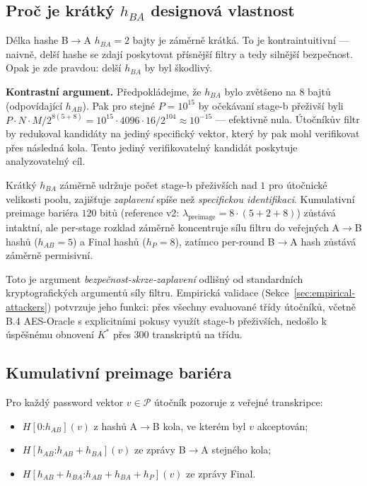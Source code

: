 \documentclass[11pt,a4paper]{article}
\begin{document}
\subsection{Proč je krátký $h_{BA}$ designová vlastnost}

Délka hashe B$\to$A $h_{BA} = 2$ bajty je záměrně krátká. To je kontraintuitivní --- naivně, delší hashe se zdají poskytovat přísnější filtry a tedy silnější bezpečnost. Opak je zde pravdou: delší $h_{BA}$ by byl škodlivý.

\textbf{Kontrastní argument.} Předpokládejme, že $h_{BA}$ bylo zvětšeno na $8$ bajtů (odpovídající $h_{AB}$). Pak pro stejné $P = 10^{15}$ by očekávaní stage-b přeživší byli $P \cdot N \cdot M / 2^{8(5+8)} = 10^{15} \cdot 4096 \cdot 16 / 2^{104} \approx 10^{-15}$ --- efektivně nula. Útočníkův filtr by redukoval kandidáty na jediný specifický vektor, který by pak mohl verifikovat přes následná kola. Tento jediný verifikovatelný kandidát poskytuje analyzovatelný cíl.

Krátký $h_{BA}$ záměrně udržuje počet stage-b přeživších nad $1$ pro útočnické velikosti poolu, zajišťuje \emph{zaplavení} spíše než \emph{specifickou identifikaci}. Kumulativní preimage bariéra $120$ bitů (reference v2: $\lambda_\text{preimage} = 8 \cdot (5 + 2 + 8)$) zůstává intaktní, ale per-stage rozklad záměrně koncentruje sílu filtru do veřejných A$\to$B hashů ($h_{AB} = 5$) a Final hashů ($h_P = 8$), zatímco per-round B$\to$A hash zůstává záměrně permisivní.

Toto je argument \emph{bezpečnost-skrze-zaplavení} odlišný od standardních kryptografických argumentů síly filtru. Empirická validace (Sekce~\ref{sec:empirical-attackers}) potvrzuje jeho funkci: přes všechny evaluované třídy útočníků, včetně B.4 AES-Oracle s explicitními pokusy využít stage-b přeživších, nedošlo k úspěšnému obnovení $K^*$ přes $300$ transkriptů na třídu.

\subsection{Kumulativní preimage bariéra}

Pro každý password vektor $v \in \mathcal{P}$ útočník pozoruje z veřejné transkripce:
\begin{itemize}[leftmargin=*]
\item $H[0\mathord{:}h_{AB}](v)$ z hashů A$\to$B kola, ve kterém byl $v$ akceptován;
\item $H[h_{AB}\mathord{:}h_{AB}+h_{BA}](v)$ ze zprávy B$\to$A stejného kola;
\item $H[h_{AB}+h_{BA}\mathord{:}h_{AB}+h_{BA}+h_P](v)$ ze zprávy Final.
\end{itemize}
\end{document}
